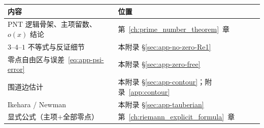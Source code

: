 \begin{center}
\begin{tabular}{ll}
\hline
\textbf{内容} & \textbf{位置} \\
\hline
PNT 逻辑骨架、主项留数、$o(x)$ 结论 & 第~\ref{ch:prime_number_theorem}~章 \\
$3$--$4$--$1$ 不等式与反证细节 & 本附录 §\ref{sec:app-no-zero-Re1} \\
零点自由区与误差~\eqref{eq:app-psi-error} & 本附录 §\ref{sec:app-zero-free} \\
围道边估计 & 本附录 §\ref{sec:app-contour}；附录~\ref{app:contour} \\
Ikehara / Newman & 本附录 §\ref{sec:app-tauberian} \\
显式公式（主项$+$全部零点） & 第~\ref{ch:riemann_explicit_formula}~章 \\
\hline
\end{tabular}
\end{center}
